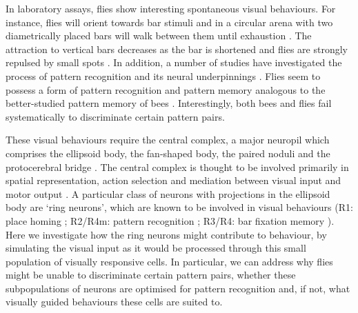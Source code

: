 In laboratory assays, flies show interesting spontaneous visual behaviours. For instance, flies will orient towards bar stimuli \cite{Reichardt1969,Gotz1987} and in a circular arena with two diametrically placed bars will walk between them until exhaustion \cite{Strauss1993}. The attraction to vertical bars decreases as the bar is shortened and flies are strongly repulsed by small spots \cite{Maimon2008}. In addition, a number of studies have investigated the process of pattern recognition and its neural underpinnings \cite{Ernst1999,Liu2006,Pan2009}. Flies seem to possess a form of pattern recognition and pattern memory analogous to the better-studied pattern memory of bees \cite{vonFrisch1914,Giurfa1997,Horridge2009}. Interestingly, both bees \cite{Srinivasan1994} and flies \cite{Ernst1999} fail systematically to discriminate certain pattern pairs. 

These visual behaviours require the central complex, a major neuropil which comprises the ellipsoid body, the fan-shaped body, the paired noduli and the protocerebral bridge \cite{Young2010}. The central complex is thought to be involved primarily in spatial representation, action selection and mediation between visual input and motor output \cite{Pfeiffer2014}. A particular class of neurons with projections in the ellipsoid body are `ring neurons', which are known to be involved in visual behaviours (R1: place homing \cite{Sitaraman2008,Sitaraman2010,Ofstad2011}; R2/R4m: pattern recognition \cite{Ernst1999,Liu2006,Pan2009}; R3/R4: bar fixation memory \cite{Neuser2008}). Here we investigate how the ring neurons might contribute to behaviour, by simulating the visual input as it would be processed through this small population of visually responsive cells. In particular, we can address why flies might be unable to discriminate certain pattern pairs, whether these subpopulations of neurons are optimised for pattern recognition and, if not, what visually guided behaviours these cells are suited to.


